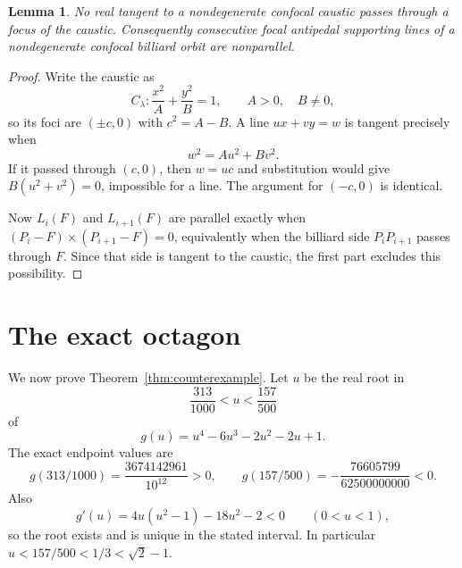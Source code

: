 \documentclass[11pt,a4paper]{amsart}
\newtheorem{lemma}[theorem]{Lemma}
\theoremstyle{definition}
\theoremstyle{remark}
\newcommand{\cross}{\mathbin{\times}}
\begin{document}
\begin{lemma}\label{lem:finite}
No real tangent to a nondegenerate confocal caustic passes through a focus of
the caustic.  Consequently consecutive focal antipedal supporting lines of a
nondegenerate confocal billiard orbit are nonparallel.
\end{lemma}

\begin{proof}
Write the caustic as
\[
 C_\lambda:\frac{x^2}{A}+\frac{y^2}{B}=1,
 \qquad A>0,\quad B\ne0,
\]
so its foci are $(\pm c,0)$ with $c^2=A-B$.  A line
$ux+vy=w$ is tangent precisely when
\[
 w^2=Au^2+Bv^2.
\]
If it passed through $(c,0)$, then $w=uc$ and substitution would give
$B(u^2+v^2)=0$, impossible for a line.  The argument for $(-c,0)$ is
identical.

Now $L_i(F)$ and $L_{i+1}(F)$ are parallel exactly when
$(P_i-F)\cross(P_{i+1}-F)=0$, equivalently when the billiard side
$P_iP_{i+1}$ passes through $F$.  Since that side is tangent to the caustic,
the first part excludes this possibility.
\end{proof}

\section{The exact octagon}

We now prove Theorem~\ref{thm:counterexample}.  Let $u$ be the real root in
\begin{equation}\label{eq:root-interval}
 \frac{313}{1000}<u<\frac{157}{500}
\end{equation}
of
\begin{equation}\label{eq:g}
 g(u)=u^4-6u^3-2u^2-2u+1.
\end{equation}
The exact endpoint values are
\[
 g(313/1000)=\frac{3674142961}{10^{12}}>0,
 \qquad
 g(157/500)=-\frac{76605799}{62500000000}<0.
\]
Also
\[
 g'(u)=4u(u^2-1)-18u^2-2<0\qquad(0<u<1),
\]
so the root exists and is unique in the stated interval.  In particular
$u<157/500<1/3<\sqrt2-1$.
\end{document}
